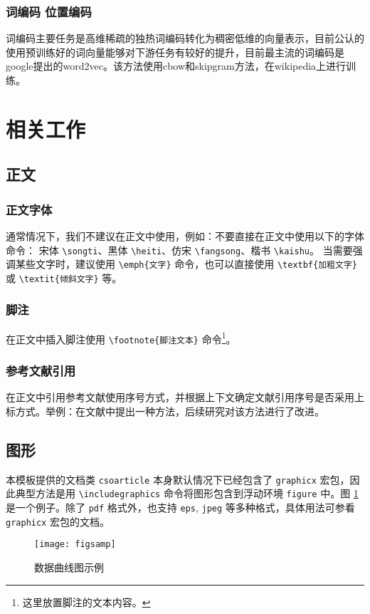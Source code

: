 \documentclass[UTF8]{csoarticle}
\begin{document}
\subsubsection{词编码 位置编码}
词编码主要任务是高维稀疏的独热词编码转化为稠密低维的向量表示，目前公认的使用预训练好的词向量能够对下游任务有较好的提升，目前最主流的词编码是google提出的word2vec。该方法使用cbow和skipgram方法，在wikipedia上进行训练。
\section{相关工作}

\subsection{正文}

\subsubsection{正文字体}

通常情况下，我们不建议在正文中使用，例如：不要直接在正文中使用以下的字体命令：
宋体 \verb|\songti|、黑体 \verb|\heiti|、仿宋 \verb|\fangsong|、楷书 \verb|\kaishu|。
当需要强调某些文字时，建议使用 \verb|\emph{文字}| 命令，也可以直接使用 \verb|\textbf{加粗文字}| 或 \verb|\textit{倾斜文字}| 等。

\subsubsection{脚注}

在正文中插入脚注使用 \verb|\footnote{脚注文本}| 命令\footnote{这里放置脚注的文本内容。}。

\subsubsection{参考文献引用}

在正文中引用参考文献使用序号方式，并根据上下文确定文献引用序号是否采用上标方式。举例：在文献\cite{bib1}中提出一种方法，后续研究对该方法进行了改进。

\subsection{图形}

本模板提供的文档类 \verb|csoarticle| 本身默认情况下已经包含了 \verb|graphicx| 宏包，因此典型方法是用 \verb|\includegraphics| 命令将图形包含到浮动环境 \verb|figure| 中。图 \ref{fig:sample} 是一个例子。除了 \verb|pdf| 格式外，也支持 \verb|eps|, \verb|jpeg| 等多种格式，具体用法可参看 \verb|graphicx| 宏包的文档。
\begin{figure}
\centering\texttt{[image: figsamp]}
\caption{数据曲线图示例}
\label{fig:sample}
\end{figure}
\end{document}
